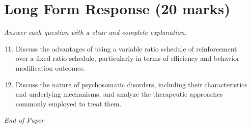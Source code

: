 \documentclass[12pt]{article}
\begin{document}
\section*{Long Form Response (20 marks)}
\textit{Answer each question with a clear and complete explanation.}
\begin{enumerate}[label=\arabic*.]
\setcounter{enumi}{10}
\item Discuss the advantages of using a variable ratio schedule of reinforcement over a fixed
ratio schedule, particularly in terms of efficiency and behavior modification outcomes.
\item Discuss the nature of psychosomatic disorders, including their characteristics and
underlying mechanisms, and analyze the therapeutic approaches commonly employed to treat
them.
\end{enumerate}

\vfill
\noindent\textit{End of Paper}
\end{document}
